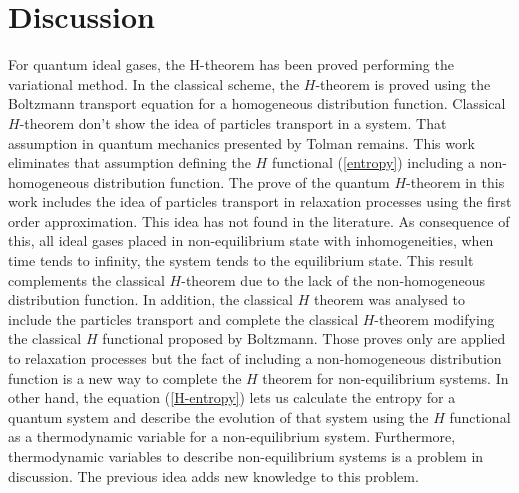 \documentclass{article}
\begin{document}
\section{Discussion}
For quantum ideal gases, the H-theorem has been proved performing the variational method. In the classical scheme, the $H$-theorem is proved using the Boltzmann transport equation for a homogeneous distribution function. Classical $H$-theorem don't show the idea of particles transport in a system. That assumption in quantum mechanics presented by Tolman \cite{tolman} remains. This work eliminates that assumption defining the $H$ functional (\ref{entropy}) including a non-homogeneous distribution function. The prove of the quantum $H$-theorem in this work includes the idea of particles transport in relaxation processes using the first order approximation. This idea has not found in the literature. As consequence of this, all ideal gases placed in non-equilibrium state with inhomogeneities, when time tends to infinity, the system tends to the equilibrium state. This result complements the classical $H$-theorem due to the lack of the non-homogeneous distribution function. In addition, the classical $H$ theorem was analysed to include the particles transport and complete the classical $H$-theorem modifying the classical $H$ functional proposed by Boltzmann. Those proves only are applied to relaxation processes but the fact of including a non-homogeneous distribution function is a new way to complete the $H$ theorem for non-equilibrium systems. 
In other hand, the equation (\ref{H-entropy}) lets us calculate the entropy for a quantum system and describe the evolution of that system using the $H$ functional as a thermodynamic variable for a non-equilibrium system. Furthermore, thermodynamic variables to describe non-equilibrium systems is a problem in discussion. The previous idea adds new knowledge to this problem. 
\end{document}
